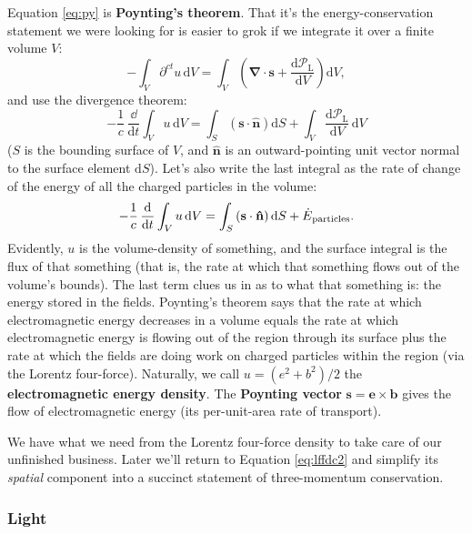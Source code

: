 \documentclass[12pt]{article}
\renewcommand{\vv}[1]{\mathbf{#1}}
\newcommand{\dd}[1]{\mathrm{d}#1}
\newcommand{\del}{\boldsymbol{\nabla}}
\begin{document}
Equation \ref{eq:py} is \textbf{Poynting's theorem}. That it's the energy-conservation statement we were looking for is easier to grok if we integrate it over a finite volume $V$:
\begin{equation*}
- \int_V \partial^{ct} u \, \dd V = \int_V \left(  \del \cdot \vv s + \dfrac{\dd \mathcal{P}_{\textrm{L}}}{\dd V} \right) \dd V ,
\end{equation*}
and use the divergence theorem:
\begin{equation*}
- \dfrac{1}{c} \, \dfrac{\dd}{\dd t} \int_V u \, \dd V = \int_S \left( \vv s \cdot \vv{\hat{n}} \right) \dd S + \int_V \dfrac{\dd \mathcal{P}_{\textrm{L}}}{\dd V} \, \dd V
\end{equation*}
($S$ is the bounding surface of $V$, and $\vv{\hat{n}}$ is an outward-pointing unit vector normal to the surface element $\dd S$). Let's also write the last integral as the rate of change of the energy of all the charged particles in the volume:
\begin{equation*}
- \dfrac{1}{c} \, \dfrac{\dd}{\dd t} \int_V u \, \dd V = \int_S \left( \vv s \cdot \vv{\hat{n}} \right) \dd S + \dot{E}_{\mkern1mu \textrm{particles}} .
\end{equation*}
Evidently, $u$ is the volume-density of something, and the surface integral is the flux of that something (that is, the rate at which that something flows out of the volume's bounds). The last term clues us in as to what that something is: the energy stored in the fields. Poynting's theorem says that the rate at which electromagnetic energy decreases in a volume equals the rate at which electromagnetic energy is flowing out of the region through its surface plus the rate at which the fields are doing work on charged particles within the region (via the Lorentz four-force). Naturally, we call $u = (e^2 + b^2)/2$ the \textbf{electromagnetic energy density}. The \textbf{Poynting vector} $\vv s = \vv e \times \vv b$ gives the flow of electromagnetic energy (its per-unit-area rate of transport).

We have what we need from the Lorentz four-force density to take care of our unfinished business. Later we'll return to Equation \ref{eq:lffdc2} and simplify its \emph{spatial} component into a succinct statement of three-momentum conservation.


\subsubsection{Light}\label{sssec:li}
\end{document}
